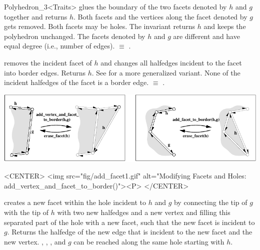 \begin{ccRefClass}{Polyhedron_3<Traits>}
   {glues the boundary of the two facets denoted by $h$ and $g$ together 
    and returns $h$. Both facets and the vertices along the facet denoted
    by $g$ gets removed. Both facets may be holes. The invariant 
     returns $h$ and keeps the 
    polyhedron unchanged.
    \ccPrecond The facets denoted by $h$ and $g$ are different and have
    equal degree (i.e., number of edges).
      $\equiv$ 
    .}


    {removes the incident facet of $h$ and changes all halfedges incident 
    to the facet into border edges. Returns $h$. 
    See  for a more generalized variant.    
    \ccPrecond None of the incident halfedges of the facet is a border edge.
      $\equiv$ 
    .}


\begin{ccTexOnly}
    \begin{center}
      \parbox{\textwidth}{%
          \includegraphics[width=\textwidth]{Polyhedron_ref/fig/add_facet}%
      }
    \end{center}
\end{ccTexOnly}

\begin{ccHtmlOnly}
    <CENTER>
    <img src="fig/add_facet1.gif" 
     alt="Modifying Facets and Holes: add_vertex_and_facet_to_border()"><P>
    </CENTER>
\end{ccHtmlOnly}


   {creates a new facet within the hole incident to $h$
   and $g$ by connecting the tip of $g$ with the tip of $h$ 
   with two new halfedges and a new vertex and filling this separated
   part of the hole with a new facet, such that the new facet is
   incident to $g$. Returns the halfedge of the new edge that is
   incident to the new facet and the new vertex.
    \ccPrecond {}, , , 
    and $g$ can be reached along the same hole starting with $h$.}


\end{ccRefClass}
